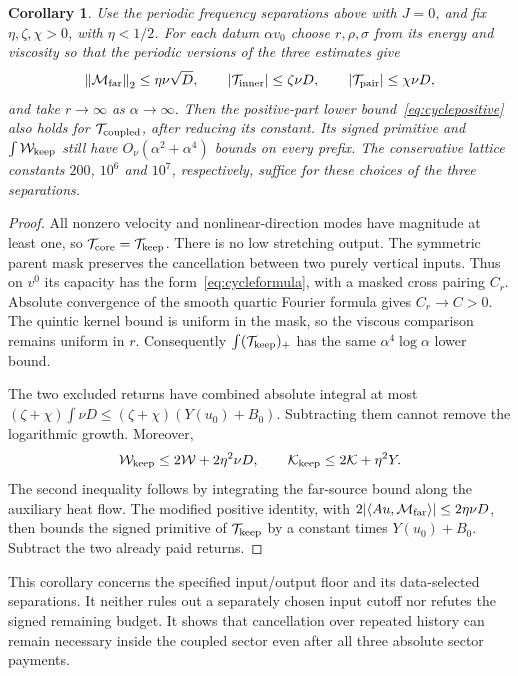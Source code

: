\documentclass[11pt]{article}
\newtheorem{corollary}[proposition]{Corollary}
\newcommand{\norm}[1]{\left\lVert#1\right\rVert}
\begin{document}
\begin{corollary}\label{cor:coupledcycles}
Use the periodic frequency separations above with $J=0$, and fix
$\eta,\zeta,\chi>0$, with $\eta<1/2$. For each datum $\alpha v_0$ choose
$r,\rho,\sigma$ from its energy and viscosity so that the periodic
versions of the three estimates give
\[
 \norm{\mathcal M_{\rm far}}_2\leq\eta\nu\sqrt D,\qquad
 |\mathcal T_{\rm inner}|\leq\zeta\nu D,\qquad
 |\mathcal T_{\rm pair}|\leq\chi\nu D,
\]
and take $r\to\infty$ as $\alpha\to\infty$. Then the positive-part
lower bound~\eqref{eq:cyclepositive} also holds for
$\mathcal T_{\rm coupled}$, after reducing its constant.
Its signed primitive and $\int\mathcal W_{\rm keep}$ still have
$O_\nu(\alpha^2+\alpha^4)$ bounds on every prefix.
The conservative lattice constants $200$, $10^6$ and $10^7$, respectively,
suffice for these choices of the three separations.
\end{corollary}
\begin{proof}
All nonzero velocity and nonlinear-direction modes have magnitude at
least one, so $\mathcal T_{\rm core}=\mathcal T_{\rm keep}$.
There is no low stretching output. The symmetric parent mask preserves
the cancellation between two purely vertical inputs. Thus on $v^0$ its
capacity has the form~\eqref{eq:cycleformula}, with a masked cross
pairing $C_r$. Absolute convergence of the smooth quartic Fourier
formula gives $C_r\to C>0$. The quintic kernel bound is uniform in
the mask, so the viscous comparison remains uniform in $r$.
Consequently $\int(\mathcal T_{\rm keep})_+$ has the same
$\alpha^4\log\alpha$ lower bound.

The two excluded returns have combined absolute integral at most
$(\zeta+\chi)\int\nu D\leq(\zeta+\chi)(Y(u_0)+B_0)$.
Subtracting them cannot remove the logarithmic growth. Moreover,
\[
 \mathcal W_{\rm keep}\leq2\mathcal W+2\eta^2\nu D,
 \qquad \mathcal K_{\rm keep}\leq2\mathcal K+\eta^2Y.
\]
The second inequality follows by integrating the far-source bound along
the auxiliary heat flow. The modified positive identity, with
$2|\langle Au,\mathcal M_{\rm far}\rangle|\leq2\eta\nu D$,
then bounds the signed primitive of $\mathcal T_{\rm keep}$ by a
constant times $Y(u_0)+B_0$. Subtract the two already paid returns.
\end{proof}

This corollary concerns the specified input/output floor and its
data-selected separations. It neither rules out a separately chosen
input cutoff nor refutes the signed remaining budget. It shows that
cancellation over repeated history can remain necessary inside the
coupled sector even after all three absolute sector payments.
\end{document}
